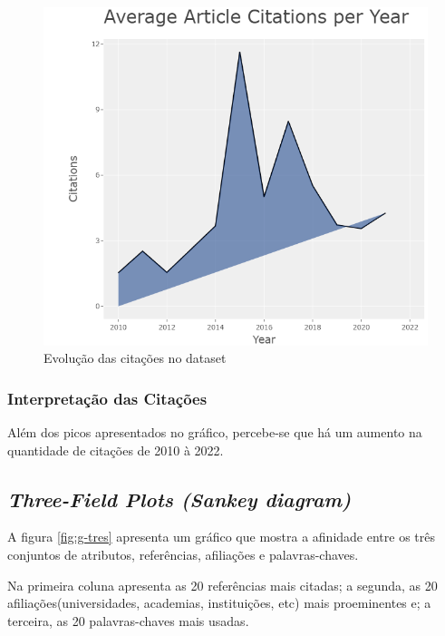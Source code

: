 \begin{figure}[ht]
    \centering
    \includegraphics[width=12cm]{experiments/Tong00020/PesquisaBibliometrica/DataSet/MASSA@Tong00020-Average Citations per Year.png}
    \caption{Evolução das citações no dataset}
    \label{fig:average-cit}
\end{figure}

\subsubsection{Interpretação das Citações}
Além dos picos apresentados no gráfico, percebe-se que há um aumento na quantidade de citações de 2010 à 2022.

\subsection{\textit{Three-Field Plots (Sankey diagram)}}
A figura \ref{fig:g-tres} apresenta um gráfico que mostra a afinidade entre os três conjuntos de atributos,  referências, afiliações e palavras-chaves.

Na primeira coluna apresenta as 20 referências mais citadas; a segunda, as 20 afiliações(universidades, academias, instituições, etc) mais proeminentes e; a terceira, as 20 palavras-chaves mais usadas.

